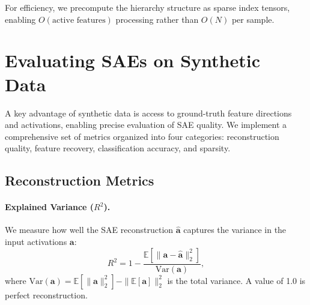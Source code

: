 \documentclass{article}
\theoremstyle{plain}
\theoremstyle{definition}
\theoremstyle{remark}
\begin{document}

For efficiency, we precompute the hierarchy structure as sparse index tensors, enabling $O(\text{active features})$ processing rather than $O(N)$ per sample.

\section{Evaluating SAEs on Synthetic Data}

A key advantage of synthetic data is access to ground-truth feature directions and activations, enabling precise evaluation of SAE quality. We implement a comprehensive set of metrics organized into four categories: reconstruction quality, feature recovery, classification accuracy, and sparsity.

\subsection{Reconstruction Metrics}

\paragraph{Explained Variance ($R^2$).} We measure how well the SAE reconstruction $\hat{\mathbf{a}}$ captures the variance in the input activations $\mathbf{a}$:
\begin{equation}
R^2 = 1 - \frac{\mathbb{E}[\|\mathbf{a} - \hat{\mathbf{a}}\|_2^2]}{\text{Var}(\mathbf{a})},
\end{equation}
where $\text{Var}(\mathbf{a}) = \mathbb{E}[\|\mathbf{a}\|_2^2] - \|\mathbb{E}[\mathbf{a}]\|_2^2$ is the total variance. A value of 1.0 is perfect reconstruction.
\end{document}
